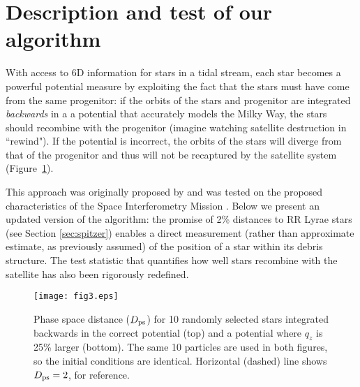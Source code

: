 \documentclass{emulateapj}
\begin{document}

\section{Description and test of our algorithm}
\label{sec:method}
With access to 6D information for stars in a tidal
stream, each star becomes a powerful potential
measure by exploiting the fact that the stars must have come from the
same progenitor: if the orbits of the stars and progenitor are integrated 
\emph{backwards} in a a potential that accurately models the Milky Way, the stars
should recombine with the progenitor (imagine watching satellite destruction in ``rewind"). If the potential is incorrect,
the orbits of the stars will diverge from that of the progenitor and
thus will not be recaptured by the satellite system (Figure~\ref{fig:ps_distance}).

This approach was originally proposed by \citet{johnston99a} and was tested on the proposed characteristics of the Space
Interferometry Mission \citep{unwin08}. Below we present an updated version of the algorithm:
the promise of 2\% distances to RR Lyrae stars (see Section
\ref{sec:spitzer}) enables a direct measurement (rather than
approximate estimate, as previously assumed) of the position of a star within its debris
structure. The test statistic that quantifies how well stars recombine
with the satellite has also been rigorously redefined.

\begin{figure}[h]
\begin{center}
\texttt{[image: fig3.eps]}
\caption{Phase space distance ($D_{\rm ps}$) for 10 randomly selected stars integrated backwards in the correct potential (top) and a potential where $q_z$ is 25\% larger (bottom). The same 10 particles are used in both figures, so the initial conditions are identical. Horizontal (dashed) line shows $D_{\rm ps}=2$, for reference.}\label{fig:ps_distance}
\end{center}
\end{figure}
\end{document}
